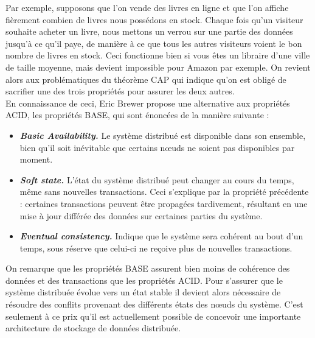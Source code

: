 	Par exemple, supposons que l'on vende des livres en ligne et que l'on affiche fièrement combien de livres nous possédons en stock. Chaque fois qu'un visiteur souhaite acheter un livre, nous mettons un verrou sur une partie des données jusqu'à ce qu'il paye, de manière à ce que tous les autres visiteurs voient le bon nombre de livres en stock. Ceci fonctionne bien si vous êtes un libraire d'une ville de taille moyenne, mais devient impossible pour Amazon par exemple. On revient alors aux problématiques du théorème CAP qui indique qu'on est obligé de sacrifier une des trois propriétés pour assurer les deux autres.\\

	En connaissance de ceci, Eric Brewer propose une alternative aux propriétés ACID, les propriétés BASE, qui sont énoncées de la manière suivante :
	\vspace{10px}
	\begin{itemize}
	 	\item \textbf{\textit{Basic Availability.}} Le système distribué est disponible dans son ensemble, bien qu'il soit inévitable que certains nœuds ne soient pas disponibles par moment.
	 	\item \textbf{\textit{Soft state.}} L'état du système distribué peut changer au cours du temps, même sans nouvelles transactions. Ceci s'explique par la propriété précédente : certaines transactions peuvent être propagées tardivement, résultant en une mise à jour différée des données sur certaines parties du système.
	 	\item \textbf{\textit{Eventual consistency.}} Indique que le système sera cohérent au bout d'un temps, sous réserve que celui-ci ne reçoive plus de nouvelles transactions.
	 \end{itemize}
	 \vspace{20px}
	 On remarque que les propriétés BASE assurent bien moins de cohérence des données et des transactions que les propriétés ACID. Pour s'assurer que le système distribuée évolue vers un état stable il devient alors nécessaire de résoudre des conflits provenant des différents états des nœuds du système. C'est seulement à ce prix qu'il est actuellement possible de concevoir une importante architecture de stockage de données distribuée. 
